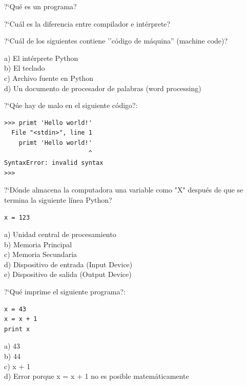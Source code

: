 \begin{ex}
?`Qu\'e es un programa?
\end{ex}

\begin{ex}
?`Cu\'al es la diferencia entre compilador e int\'erprete?
\end{ex}

\begin{ex}
?`Cu\'al de los siguientes contiene ''c\'odigo de m\'aquina'' (machine code)?

a) El int\'erprete Python\\
b) El teclado\\
c) Archivo fuente en Python\\
d) Un documento de procesador de palabras (word processing)
\end{ex}

\begin{ex}
?`Q\'ue hay de malo en el siguiente c\'odigo?:

\beforeverb
\begin{verbatim}
>>> primt 'Hello world!'
  File "<stdin>", line 1
    primt 'Hello world!'
                       ^
SyntaxError: invalid syntax
>>> 
\end{verbatim}
\afterverb

\end{ex}

\begin{ex}
?`D\'onde almacena la computadora una variable como "X" despu\'es de que  
se termina la siguiente l\'inea Python?

\beforeverb
\begin{verbatim}
x = 123
\end{verbatim}
\afterverb
%
a) Unidad central de procesamiento\\
b) Memoria Principal\\
c) Memoria Secundaria\\
d) Dispositivo de entrada (Input Device)\\
e) Dispositivo de salida (Output Device)
\end{ex}

\begin{ex}
?`Qu\'e imprime el siguiente programa?:

\beforeverb
\begin{verbatim}
x = 43
x = x + 1
print x
\end{verbatim}
\afterverb
%
a) 43\\
b) 44\\
c) x + 1\\
d) Error porque x = x + 1 no es posible matem\'aticamente
\end{ex}


